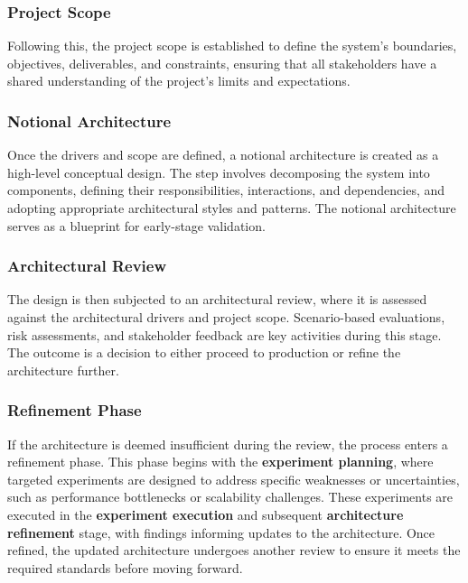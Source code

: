 \subsubsection{Project Scope}

Following this, the project scope is established to define the system's boundaries, objectives, deliverables, and constraints, ensuring that all stakeholders have a shared understanding of the project's limits and expectations.

\subsubsection{Notional Architecture}

Once the drivers and scope are defined, a notional architecture is created as a high-level conceptual design. The step involves decomposing the system into components, defining their responsibilities, interactions, and dependencies, and adopting appropriate architectural styles and patterns. The notional architecture serves as a blueprint for early-stage validation.

\subsubsection{Architectural Review}

The design is then subjected to an architectural review, where it is assessed against the architectural drivers and project scope. Scenario-based evaluations, risk assessments, and stakeholder feedback are key activities during this stage. The outcome is a decision to either proceed to production or refine the architecture further.

\subsubsection{Refinement Phase}

If the architecture is deemed insufficient during the review, the process enters a refinement phase. This phase begins with the \textbf{experiment planning}, where targeted experiments are designed to address specific weaknesses or uncertainties, such as performance bottlenecks or scalability challenges. These experiments are executed in the \textbf{experiment execution} and subsequent \textbf{architecture refinement} stage, with findings informing updates to the architecture. Once refined, the updated architecture undergoes another review to ensure it meets the required standards before moving forward.

